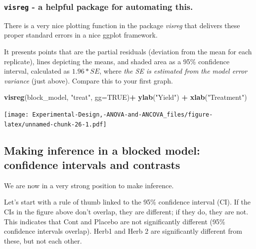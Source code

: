 \documentclass[
]{book}
\newenvironment{Shaded}{\begin{snugshade}}{\end{snugshade}}
\newcommand{\AttributeTok}[1]{\textcolor[rgb]{0.13,0.29,0.53}{#1}}
\newcommand{\ConstantTok}[1]{\textcolor[rgb]{0.56,0.35,0.01}{#1}}
\newcommand{\FunctionTok}[1]{\textcolor[rgb]{0.13,0.29,0.53}{\textbf{#1}}}
\newcommand{\NormalTok}[1]{#1}
\newcommand{\SpecialCharTok}[1]{\textcolor[rgb]{0.81,0.36,0.00}{\textbf{#1}}}
\newcommand{\StringTok}[1]{\textcolor[rgb]{0.31,0.60,0.02}{#1}}
\begin{document}
\hypertarget{visreg---a-helpful-package-for-automating-this.}{%
\subsubsection{\texorpdfstring{\texttt{visreg} - a helpful package for automating this.}{visreg - a helpful package for automating this.}}\label{visreg---a-helpful-package-for-automating-this.}}

There is a very nice plotting function in the package \emph{visreg} that delivers these proper standard errors in a nice ggplot framework.

It presents points that are the partial residuals (deviation from the mean for each replicate), lines depicting the means, and shaded area as a 95\% confidence interval, calculated as \(1.96*SE\), where \emph{the SE is estimated from the model error variance} (just above). Compare this to your first graph.

\begin{Shaded}
\begin{Highlighting}[]
\FunctionTok{visreg}\NormalTok{(block\_model, }\StringTok{"treat"}\NormalTok{, }\AttributeTok{gg=}\ConstantTok{TRUE}\NormalTok{)}\SpecialCharTok{+}
  \FunctionTok{ylab}\NormalTok{(}\StringTok{"Yield"}\NormalTok{) }\SpecialCharTok{+} 
  \FunctionTok{xlab}\NormalTok{(}\StringTok{"Treatment"}\NormalTok{) }
\end{Highlighting}
\end{Shaded}

\texttt{[image: Experimental-Design,-ANOVA-and-ANCOVA\_files/figure-latex/unnamed-chunk-26-1.pdf]}

\hypertarget{making-inference-in-a-blocked-model-confidence-intervals-and-contrasts}{%
\subsection{Making inference in a blocked model: confidence intervals and contrasts}\label{making-inference-in-a-blocked-model-confidence-intervals-and-contrasts}}

We are now in a very strong position to make inference.

Let's start with a rule of thumb linked to the 95\% confidence interval (CI). If the CIs in the figure above don't overlap, they are different; if they do, they are not. This indicates that Cont and Placebo are not significantly different (95\% confidence intervals overlap). Herb1 and Herb 2 are significantly different from these, but not each other.
\end{document}
